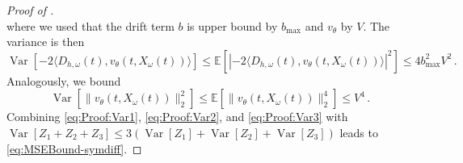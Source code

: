 \documentclass[oneside,11pt]{article}
\theoremstyle{remark}
\begin{document}
\begin{proof}[Proof of ]
\[\]
where we used that the drift term $b$ is upper bound by $b_{\text{max}}$ and $v_\theta$ by $V$. The variance is then
\begin{equation}\label{eq:Proof:Var2}
\operatorname{Var}\left[- 2\langle D_{h,\omega}(t), v_{\theta}(t, X_{\omega}(t))\rangle\right] \leq \mathbb{E}\left[|-2 \langle D_{h,\omega}(t), v_{\theta}(t, X_{\omega}(t))\rangle|^2\right] \leq 4b_{\text{max}}^2V^2\,.
\end{equation}
Analogously, we bound
\begin{equation}\label{eq:Proof:Var3}
\operatorname{Var}\left[\|v_{\theta}(t, X_{\omega}(t))\|_2^2\right] \leq \mathbb{E}\left[\|v_{\theta}(t, X_{\omega}(t))\|_2^4\right] \leq V^4\,.
\end{equation}
Combining \eqref{eq:Proof:Var1}, \eqref{eq:Proof:Var2}, and \eqref{eq:Proof:Var3} with  $\operatorname{Var}[Z_1 + Z_2 + Z_3] \leq 3(\operatorname{Var}[Z_1] + \operatorname{Var}[Z_2] + \operatorname{Var}[Z_3])$ leads to \eqref{eq:MSEBound-symdiff}.
\end{proof}
\end{document}
